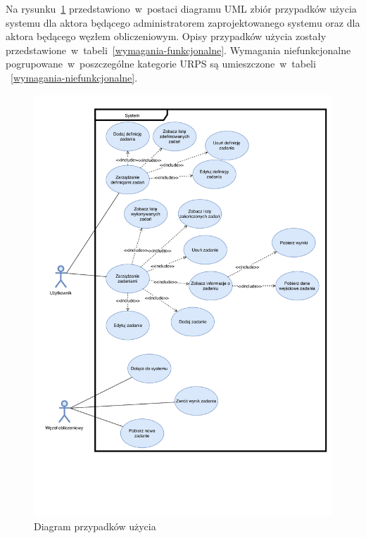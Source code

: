 \documentclass[a4paper,11pt,twoside]{report}
\theoremstyle{definition}
\begin{document}
            Na rysunku~\ref{use-cases-diagram} przedstawiono~w~postaci diagramu UML zbiór przypadków użycia systemu dla aktora będącego administratorem zaprojektowanego systemu oraz dla aktora będącego węzłem obliczeniowym. Opisy przypadków użycia zostały przedstawione~w~tabeli~\ref{wymagania-funkcjonalne}. Wymagania niefunkcjonalne pogrupowane~w~poszczególne kategorie URPS są umieszczone~w~tabeli ~\ref{wymagania-niefunkcjonalne}.
            
            \begin{figure}
                \centering
                \includegraphics[width=\textwidth,height=\textheight,keepaspectratio]{images/use-cases.pdf}
                \caption{Diagram przypadków użycia}
                \label{use-cases-diagram}
            \end{figure}
        
\end{document}
